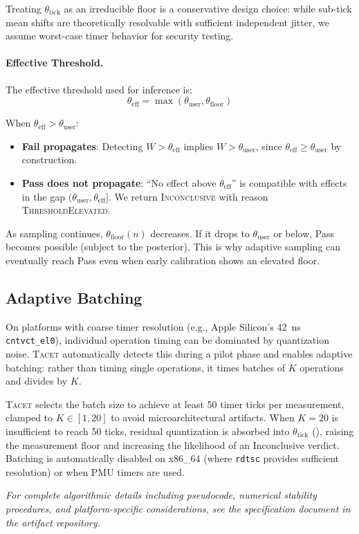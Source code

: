 \documentclass[letterpaper,twocolumn,10pt]{article}
\newcommand{\tacet}{\textsc{Tacet}\xspace}
\newcommand{\ns}[1]{\SI{#1}{\nano\second}}
\begin{document}
Treating $\theta_{\text{tick}}$ as an irreducible floor is a conservative design choice:
while sub-tick mean shifts are theoretically resolvable with sufficient independent jitter,
we assume worst-case timer behavior for security testing.

\paragraph{Effective Threshold.}
The effective threshold used for inference is:
\begin{equation}
\theta_{\text{eff}} = \max(\theta_{\text{user}}, \theta_{\text{floor}})
\end{equation}

When $\theta_{\text{eff}} > \theta_{\text{user}}$:
\begin{itemize}
\item \textbf{Fail propagates}: Detecting $W > \theta_{\text{eff}}$ implies $W > \theta_{\text{user}}$,
      since $\theta_{\text{eff}} \geq \theta_{\text{user}}$ by construction.
\item \textbf{Pass does not propagate}: ``No effect above $\theta_{\text{eff}}$'' is compatible with
      effects in the gap $(\theta_{\text{user}}, \theta_{\text{eff}}]$. We return \textsc{Inconclusive}
      with reason \textsc{ThresholdElevated}.
\end{itemize}

As sampling continues, $\theta_{\text{floor}}(n)$ decreases. If it drops to $\theta_{\text{user}}$ or below, Pass becomes possible (subject to the posterior). This is why adaptive sampling can eventually reach Pass even when early calibration shows an elevated floor.

\subsection{Adaptive Batching}
\label{app:batching}

On platforms with coarse timer resolution (e.g., Apple Silicon's \ns{42} \texttt{cntvct\_el0}),
individual operation timing can be dominated by quantization noise. \tacet automatically detects
this during a pilot phase and enables adaptive batching: rather than timing single operations,
it times batches of $K$ operations and divides by $K$.

\tacet selects the batch size to achieve at least 50 timer ticks per measurement, clamped to
$K \in [1, 20]$ to avoid microarchitectural artifacts. When $K = 20$ is insufficient to reach
50 ticks, residual quantization is absorbed into $\theta_{\text{tick}}$ (),
raising the measurement floor and increasing the likelihood of an Inconclusive verdict. Batching
is automatically disabled on x86\_64 (where \texttt{rdtsc} provides sufficient resolution) or
when PMU timers are used.

\vspace{1em}
\noindent\textit{For complete algorithmic details including pseudocode, numerical stability procedures, and platform-specific considerations, see the specification document in the artifact repository.}
\end{document}

